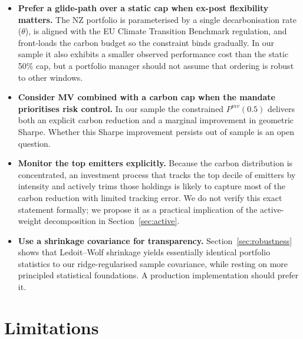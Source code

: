 \documentclass[11pt,a4paper]{article}
\begin{document}
\begin{itemize}[leftmargin=*]
  \item \textbf{Prefer a glide-path over a static cap when ex-post
        flexibility matters.} The NZ portfolio is parameterised by a
        single decarbonisation rate ($\theta$), is aligned with the EU
        Climate Transition Benchmark regulation, and front-loads the
        carbon budget so the constraint binds gradually. In our sample
        it also exhibits a smaller observed performance cost than the
        static 50\% cap, but a portfolio manager should not assume
        that ordering is robust to other windows.
  \item \textbf{Consider MV combined with a carbon cap when the
        mandate prioritises risk control.} In our sample the
        constrained $P^{mv}(0.5)$ delivers both an explicit carbon
        reduction and a marginal improvement in geometric Sharpe.
        Whether this Sharpe improvement persists out of sample is an
        open question.
  \item \textbf{Monitor the top emitters explicitly.} Because the
        carbon distribution is concentrated, an investment process
        that tracks the top decile of emitters by intensity and
        actively trims those holdings is likely to capture most of
        the carbon reduction with limited tracking error. We do not
        verify this exact statement formally; we propose it as a
        practical implication of the active-weight decomposition in
        Section~\ref{sec:active}.
  \item \textbf{Use a shrinkage covariance for transparency.}
        Section~\ref{sec:robustness} shows that Ledoit--Wolf
        shrinkage yields essentially identical portfolio statistics
        to our ridge-regularised sample covariance, while resting on
        more principled statistical foundations. A production
        implementation should prefer it.
\end{itemize}

\section{Limitations}\label{sec:limits}
\end{document}
